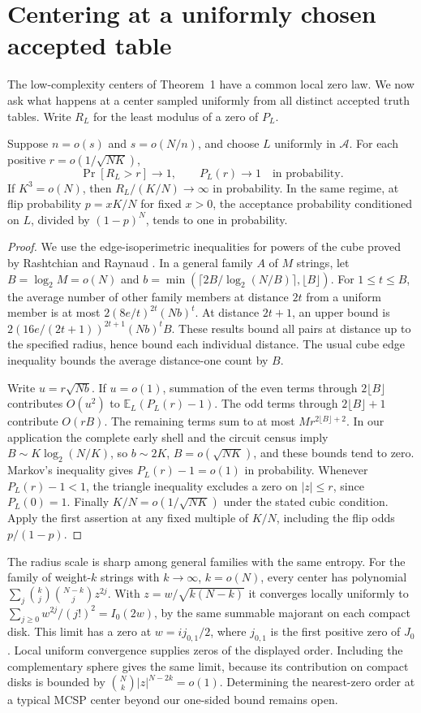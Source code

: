 \section{Centering at a uniformly chosen accepted table}
The low-complexity centers of Theorem~1 have a common local zero law. We now ask what happens at a center sampled uniformly from all distinct accepted truth tables. Write $R_L$ for the least modulus of a zero of $P_L$.
\begin{theorem}\label{th:typical}
Suppose $n=o(s)$ and $s=o(N/n)$, and choose $L$ uniformly in $\mathcal A$. For each positive $r=o(1/\sqrt{NK})$,
\[
 \Pr[R_L>r]\longrightarrow 1,\qquad P_L(r)\longrightarrow 1
 \quad\text{in probability}.
\]
If $K^3=o(N)$, then $R_L/(K/N)\to\infty$ in probability. In the same regime, at flip probability $p=xK/N$ for fixed $x>0$, the acceptance probability conditioned on $L$, divided by $(1-p)^N$, tends to one in probability.
\end{theorem}
\begin{proof}
We use the edge-isoperimetric inequalities for powers of the cube proved by Rashtchian and Raynaud \cite[Theorems~2 and~3]{rr}. In a general family $A$ of $M$ strings, let $B=\log_2 M=o(N)$ and $b=\min(\lceil2B/\log_2(N/B)\rceil,\lfloor B\rfloor)$. For $1\le t\le B$, the average number of other family members at distance $2t$ from a uniform member is at most $2(8e/t)^{2t}(Nb)^t$. At distance $2t+1$, an upper bound is $2(16e/(2t+1))^{2t+1}(Nb)^t B$. These results bound all pairs at distance up to the specified radius, hence bound each individual distance. The usual cube edge inequality bounds the average distance-one count by $B$.

Write $u=r\sqrt{Nb}$. If $u=o(1)$, summation of the even terms through $2\lfloor B\rfloor$ contributes $O(u^2)$ to $\mathbb E_L(P_L(r)-1)$. The odd terms through $2\lfloor B\rfloor+1$ contribute $O(rB)$. The remaining terms sum to at most $M r^{2\lfloor B\rfloor+2}$. In our application the complete early shell and the circuit census imply $B\sim K\log_2(N/K)$, so $b\sim 2K$, $B=o(\sqrt{NK})$, and these bounds tend to zero. Markov's inequality gives $P_L(r)-1=o(1)$ in probability. Whenever $P_L(r)-1<1$, the triangle inequality excludes a zero on $|z|\le r$, since $P_L(0)=1$. Finally $K/N=o(1/\sqrt{NK})$ under the stated cubic condition. Apply the first assertion at any fixed multiple of $K/N$, including the flip odds $p/(1-p)$.
\end{proof}

The radius scale is sharp among general families with the same entropy. For the family of weight-$k$ strings with $k\to\infty$, $k=o(N)$, every center has polynomial $\sum_j\binom{k}{j}\binom{N-k}{j}z^{2j}$. With $z=w/\sqrt{k(N-k)}$ it converges locally uniformly to $\sum_{j\ge0}w^{2j}/(j!)^2=I_0(2w)$, by the same summable majorant on each compact disk. This limit has a zero at $w=i j_{0,1}/2$, where $j_{0,1}$ is the first positive zero of $J_0$. Local uniform convergence supplies zeros of the displayed order. Including the complementary sphere gives the same limit, because its contribution on compact disks is bounded by $\binom Nk |z|^{N-2k}=o(1)$. Determining the nearest-zero order at a typical MCSP center beyond our one-sided bound remains open.
